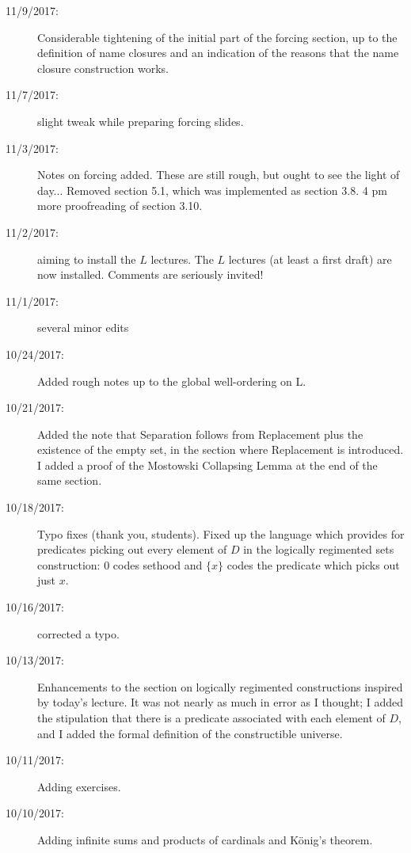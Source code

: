 \documentclass[12pt]{book}
\begin{document}
{\begin{description}
\item[11/9/2017:]  Considerable tightening of the initial part of the forcing section, up to the definition of name closures and an indication of the reasons that the name closure construction works.

\item[11/7/2017:]  slight tweak while preparing forcing slides.

\item[11/3/2017:]  Notes on forcing added.  These are still rough, but ought to see the light of day...  Removed section 5.1, which was implemented as section 3.8. 4 pm more proofreading of section 3.10.

\item[11/2/2017:]  aiming to install the $L$ lectures.  The $L$ lectures (at least a first draft) are now installed.  Comments are seriously invited!

\item[11/1/2017:]  several minor edits

\item[10/24/2017:]  Added rough notes up to the global well-ordering on L.

\item[10/21/2017:]  Added the note that Separation follows from Replacement plus the existence of the empty set, in the section where Replacement is introduced.  I added a proof of the Mostowski Collapsing Lemma at the end of the same section.

\item[10/18/2017:]  Typo fixes (thank you, students).  Fixed up the language which provides for predicates picking out every element of $D$ in the logically regimented sets construction:  0 codes sethood and $\{x\}$ codes the predicate which picks out just $x$.

\item[10/16/2017:]  corrected a typo.

\item[10/13/2017:]  Enhancements to the section on logically regimented constructions inspired by today's lecture.   It was not nearly as much in error as I thought;  I added the stipulation that there is a predicate associated with each element of $D$, and I added the formal definition of the constructible universe.

\item[10/11/2017:]  Adding exercises.

\item[10/10/2017:]  Adding infinite sums and products of cardinals and K\"onig's theorem.


\end{description}}
\end{document}
